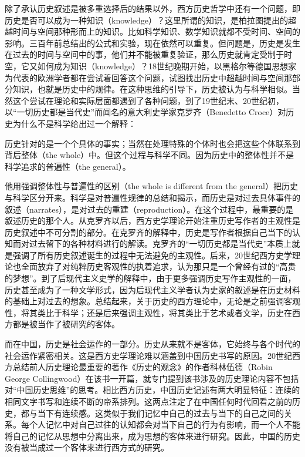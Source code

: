 
除了承认历史叙述是被多重选择后的结果以外，西方历史哲学中还有一个问题，即历史是否可以成为一种知识（knowledge）？这里所谓的知识，是柏拉图提出的超越时间与空间那种形而上的知识。比如科学知识、数学知识就都不受时间、空间的影响。三百年前总结出的公式和实验，现在依然可以重复。但问题是，历史是发生在过去的时间与空间中的事，他们并不能被重复验证，那么历史就肯定受制于时空，它又如何成为知识（knowledge）？18世纪晚期开始，以黑格尔等德国思想家为代表的欧洲学者都在尝试着回答这个问题，试图找出历史中超越时间与空间那部分知识，也就是历史中的规律。在这种思维的引导下，历史被认为与科学相似。当然这个尝试在理论和实际层面都遇到了各种问题，到了19世纪末、20世纪初，以“一切历史都是当代史”而闻名的意大利史学家克罗齐（Benedetto Croce）对历史为什么不是科学给出过一个解释：



\begin{bookquote}历史针对的是一个个具体的事实；当然在处理特殊的个体时也会把这些个体联系到背后整体（the whole）中。但这个过程与科学不同。因为历史中的整体性并不是科学追求的普遍性（the general）。\end{bookquote}


他用强调整体性与普遍性的区别（the whole is different from the general）把历史与科学区分开来。科学是对普遍性规律的总结和揭示，而历史是对过去具体事件的叙述（narrates），是对过去的重建（reproduction）。在这个过程中，最重要的是叙述历史的那个人。从克罗齐以后，西方史学理论开始注重历史写作者的主观性是历史叙述中不可分割的部分。在克罗齐的解释中，历史是写作者根据自己当下的认知而对过去留下的各种材料进行的解读。克罗齐的“一切历史都是当代史”本质上就是强调了所有历史叙述诞生的过程中无法避免的主观性。后来，20世纪西方史学理论也全面放弃了对纯粹历史客观性的执着追求，认为那只是一个曾经有过的“高贵的梦想”。到了后现代主义史学的解释中，由于更多强调历史写作主观性的一面，历史甚至成为了一种文学形式，因为后现代主义学者认为史家的叙述是在历史材料的基础上对过去的想象。总结起来，关于历史的西方理论中，无论是之前强调客观性，将其类比于科学；还是后来强调主观性，将其类比于艺术或者文学，历史在西方都是被当作了被研究的客体。



而在中国，历史是社会运作的一部分。历史从来就不是客体，它始终与各个时代的社会运作紧密相关。这是西方史学理论难以涵盖到中国历史书写的原因。20世纪西方总结前人历史理论最重要的著作《历史的观念》的作者科林伍德（Robin George Collingwood）在该书一开篇，就专门提到该书涉及的历史理论内容不包括对“中国历史思维”的思考。相比西方历史，中国历史记述有两大明显特征：连续的相同文字书写和连续不断的帝系排列。这两点注定了在中国任何时代回看之前的历史，都与当下有连续感。这类似于我们记忆中自己的过去与当下的自己之间的关系。每个人记忆中对自己过往的认知都会对当下自己的行为有影响，而一个人不能将自己的记忆从思想中分离出来，成为思想的客体来进行研究。因此，中国的历史没有被当成过一个客体来进行西方式的研究。


